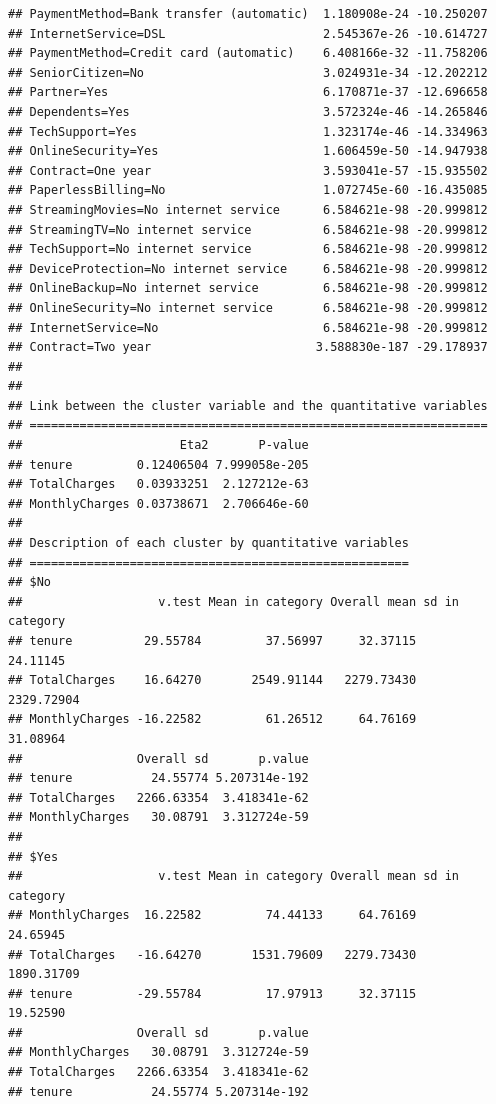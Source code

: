 \documentclass[
]{article}
\begin{document}
\begin{verbatim}
## PaymentMethod=Bank transfer (automatic)  1.180908e-24 -10.250207
## InternetService=DSL                      2.545367e-26 -10.614727
## PaymentMethod=Credit card (automatic)    6.408166e-32 -11.758206
## SeniorCitizen=No                         3.024931e-34 -12.202212
## Partner=Yes                              6.170871e-37 -12.696658
## Dependents=Yes                           3.572324e-46 -14.265846
## TechSupport=Yes                          1.323174e-46 -14.334963
## OnlineSecurity=Yes                       1.606459e-50 -14.947938
## Contract=One year                        3.593041e-57 -15.935502
## PaperlessBilling=No                      1.072745e-60 -16.435085
## StreamingMovies=No internet service      6.584621e-98 -20.999812
## StreamingTV=No internet service          6.584621e-98 -20.999812
## TechSupport=No internet service          6.584621e-98 -20.999812
## DeviceProtection=No internet service     6.584621e-98 -20.999812
## OnlineBackup=No internet service         6.584621e-98 -20.999812
## OnlineSecurity=No internet service       6.584621e-98 -20.999812
## InternetService=No                       6.584621e-98 -20.999812
## Contract=Two year                       3.588830e-187 -29.178937
## 
## 
## Link between the cluster variable and the quantitative variables
## ================================================================
##                      Eta2       P-value
## tenure         0.12406504 7.999058e-205
## TotalCharges   0.03933251  2.127212e-63
## MonthlyCharges 0.03738671  2.706646e-60
## 
## Description of each cluster by quantitative variables
## =====================================================
## $No
##                   v.test Mean in category Overall mean sd in category
## tenure          29.55784         37.56997     32.37115       24.11145
## TotalCharges    16.64270       2549.91144   2279.73430     2329.72904
## MonthlyCharges -16.22582         61.26512     64.76169       31.08964
##                Overall sd       p.value
## tenure           24.55774 5.207314e-192
## TotalCharges   2266.63354  3.418341e-62
## MonthlyCharges   30.08791  3.312724e-59
## 
## $Yes
##                   v.test Mean in category Overall mean sd in category
## MonthlyCharges  16.22582         74.44133     64.76169       24.65945
## TotalCharges   -16.64270       1531.79609   2279.73430     1890.31709
## tenure         -29.55784         17.97913     32.37115       19.52590
##                Overall sd       p.value
## MonthlyCharges   30.08791  3.312724e-59
## TotalCharges   2266.63354  3.418341e-62
## tenure           24.55774 5.207314e-192
\end{verbatim}
\end{document}
